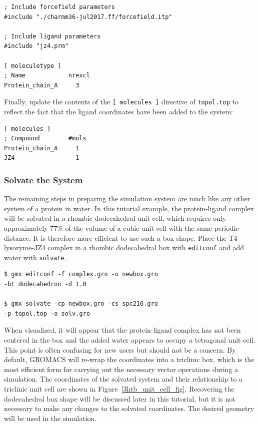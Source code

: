\documentclass[9pt,tutorial]{livecoms}
\begin{document}
\begin{verbatim}
; Include forcefield parameters
#include "./charmm36-jul2017.ff/forcefield.itp"

; Include ligand parameters
#include "jz4.prm"

[ moleculetype ]
; Name            nrexcl
Protein_chain_A     3
\end{verbatim}

Finally, update the contents of the \texttt{[ molecules ]} directive of \texttt{topol.top} to reflect the fact that the ligand coordinates have been added to the system:

\begin{verbatim}
[ molecules ]
; Compound        #mols
Protein_chain_A     1
JZ4                 1
\end{verbatim}

\subsubsection{Solvate the System} \label{complex_solv}

The remaining steps in preparing the simulation system are much like any other system of a protein in water. In this tutorial example, the protein-ligand complex will be solvated in a rhombic dodecahedral unit cell, which requires only approximately 77\% of the volume of a cubic unit cell with the same periodic distance. It is therefore more efficient to use such a box shape. Place the T4 lysozyme-JZ4 complex in a rhombic dodecahedral box with \texttt{editconf} and add water with \texttt{solvate}.

\begin{verbatim}
$ gmx editconf -f complex.gro -o newbox.gro
-bt dodecahedron -d 1.0

$ gmx solvate -cp newbox.gro -cs spc216.gro
-p topol.top -o solv.gro
\end{verbatim}

When visualized, it will appear that the protein-ligand complex has not been centered in the box and the added water appears to occupy a tetragonal unit cell. This point is often confusing for new users but should not be a concern. By default, GROMACS will re-wrap the coordinates into a triclinic box, which is the most efficient form for carrying out the necessary vector operations during a simulation. The coordinates of the solvated system and their relationship to a triclinic unit cell are shown in Figure~\ref{3htb_unit_cell_fig}. Recovering the dodecahedral box shape will be discussed later in this tutorial, but it is not necessary to make any changes to the solvated coordinates. The desired geometry will be used in the simulation.
\end{document}
